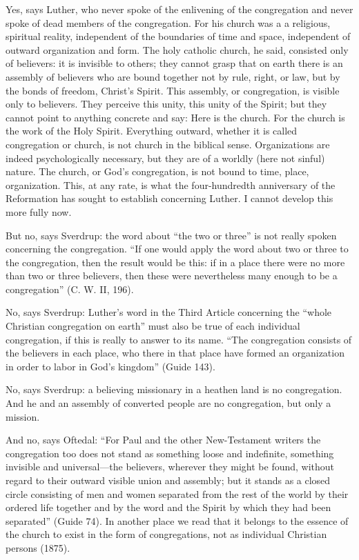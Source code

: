 Yes, says Luther, who never spoke of the enlivening of the congregation and never spoke of dead members of the congregation. For his church was a a religious, spiritual reality, independent of the boundaries of time and space, independent of outward organization and form. The holy catholic church, he said, consisted only of believers: it is invisible to others; they cannot grasp that on earth there is an assembly of believers who are bound together not by rule, right, or law, but by the bonds of freedom, Christ’s Spirit. This assembly, or congregation, is visible only to believers. They perceive this unity, this unity of the Spirit; but they cannot point to anything concrete and say: Here is the church. For the church is the work of the Holy Spirit. Everything outward, whether it is called congregation or church, is not church in the biblical sense. Organizations are indeed psychologically necessary, but they are of a worldly (here not sinful) nature. The church, or God’s congregation, is not bound to time, place, organization. This, at any rate, is what the four-hundredth anniversary of the Reformation has sought to establish concerning Luther. I cannot develop this more fully now.

But no, says Sverdrup: the word about “the two or three” is not really spoken concerning the congregation. “If one would apply the word about two or three to the congregation, then the result would be this: if in a place there were no more than two or three believers, then these were nevertheless many enough to be a congregation” (C. W. II, 196).

No, says Sverdrup: Luther’s word in the Third Article concerning the “whole Christian congregation on earth” must also be true of each individual congregation, if this is really to answer to its name. “The congregation consists of the believers in each place, who there in that place have formed an organization in order to labor in God’s kingdom” (Guide 143).

No, says Sverdrup: a believing missionary in a heathen land is no congregation. And he and an assembly of converted people are no congregation, but only a mission.

And no, says Oftedal: “For Paul and the other New-Testament writers the congregation too does not stand as something loose and indefinite, something invisible and universal—the believers, wherever they might be found, without regard to their outward visible union and assembly; but it stands as a closed circle consisting of men and women separated from the rest of the world by their ordered life together and by the word and the Spirit by which they had been separated” (Guide 74). In another place we read that it belongs to the essence of the church to exist in the form of congregations, not as individual Christian persons (1875).

